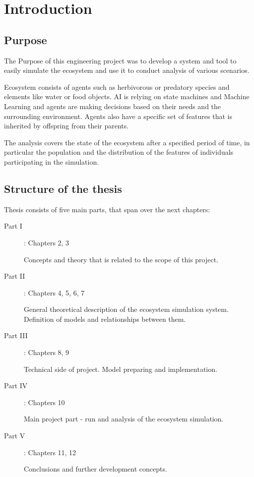 \chapter{Introduction}
\section{Purpose}
The Purpose of this engineering project was to develop a system and tool to easily simulate the ecosystem and use it to conduct analysis of various scenarios.

Ecosystem consists of agents such as herbivorous or predatory species and elements like water or food objects. AI is relying on state machines and Machine Learning and agents are making decisions based on their needs and the surrounding environment. Agents also have a specific set of features that is inherited by offspring from their parents. 

The analysis covers the state of the ecosystem after a specified period of time, in particular the population and the distribution of the features of individuals participating in the simulation. 
\section{Structure of the thesis} 
Thesis consists of five main parts, that span over the next chapters: 
\begin{description}
    \item[Part I]: Chapters 2, 3
    
    Concepts and theory that is related to the scope of this project.
    
    \item[Part II]: Chapters 4, 5, 6, 7
        
    General theoretical description of the ecosystem simulation system. Definition of models and relationships between them.
    
    \item[Part III]: Chapters 8, 9
    
    Technical side of project. Model preparing and implementation.
    
    \item[Part IV]: Chapters 10
    
    Main project part - run and analysis of the ecosystem simulation.
    
    \item[Part V]: Chapters 11, 12
    
    Conclusions and further development concepts.
    
\end{description}